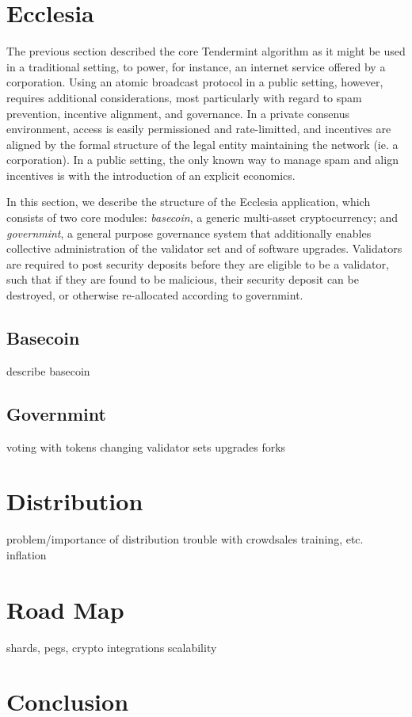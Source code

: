 \documentclass[12pt]{article}
\begin{document}
\section{ Ecclesia }

The previous section described the core Tendermint algorithm
as it might be used in a traditional setting, to power, for instance,
an internet service offered by a corporation.
Using an atomic broadcast protocol in a public setting, however,
requires additional considerations, most particularly with regard to
spam prevention, incentive alignment, and governance.
In a private consenus environment, access is easily permissioned and rate-limitted,
and incentives are aligned by the formal structure of the legal entity maintaining the network (ie. a corporation).
In a public setting, the only known way to manage spam and align incentives is with the introduction of 
an explicit economics.

In this section, we describe the structure of the Ecclesia application,
which consists of two core modules: \emph{basecoin},  a generic multi-asset cryptocurrency;
and \emph{governmint}, a general purpose governance system that additionally enables collective administration of the validator set and of software upgrades.
Validators are required to post security deposits before they are eligible to be a validator,
such that if they are found to be malicious, their security deposit can be destroyed, 
or otherwise re-allocated according to governmint.

\subsection{ Basecoin }
describe basecoin

\subsection{ Governmint }
voting with tokens
changing validator sets
upgrades
forks

\section{ Distribution }
problem/importance of distribution
trouble with crowdsales
training, etc.
inflation

\section{Road Map}
shards, pegs, crypto
integrations
scalability

\section{Conclusion}



\printbibliography
\end{document}
